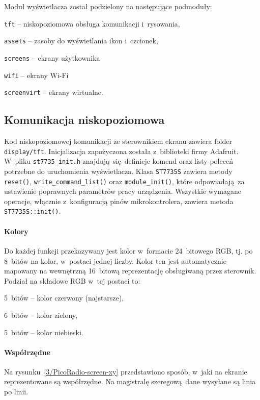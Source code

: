 \documentclass[polish]{aghengthesis}
\let\tempone\itemize
\let\temptwo\enditemize
\renewenvironment{itemize}{\tempone\setlength{\itemsep}{0cm}}{\temptwo}
\begin{document}
		\noindent
		Moduł wyświetlacza został podzielony na następujące podmoduły:
		\begin{itemize}
			\item \lstinline|tft| -- niskopoziomowa obsługa komunikacji i~rysowania,
			\item \lstinline|assets| -- zasoby do wyświetlania ikon i~czcionek,
			\item \lstinline|screens| -- ekrany użytkownika
			\begin{itemize}
				\item \lstinline|wifi| -- ekrany Wi-Fi
			\end{itemize}
			\item \lstinline|screenvirt| -- ekrany wirtualne.
		\end{itemize}
		
		\subsection{Komunikacja niskopoziomowa}
			Kod niskopoziomowej komunikacji ze sterownikiem ekranu zawiera folder \lstinline|display/tft|. Inicjalizacja zapożyczona została z~biblioteki firmy Adafruit. W~pliku \lstinline|st7735_init.h| znajdują się definicje komend oraz listy poleceń potrzebne do uruchomienia wyświetlacza. Klasa \lstinline|ST7735S| zawiera metody \lstinline|reset()|, \lstinline|write_command_list()| oraz \lstinline|module_init()|, które odpowiadają za ustawienie poprawnych parametrów pracy urządzenia. Wszystkie wymagane operacje, włącznie z~konfiguracją pinów mikrokontrolera, zawiera metoda \lstinline|ST7735S::init()|.
			
		\paragraph{Kolory}
			Do każdej funkcji przekazywany jest kolor w~formacie 24~bitowego RGB, tj. po 8~bitów na kolor, w~postaci jednej liczby. Kolor ten jest automatycznie mapowany na wewnętrzną 16~bitową reprezentację obsługiwaną przez sterownik. Podział na składowe RGB w~tej postaci to:
			\begin{itemize}
				\item 5~bitów -- kolor czerwony (najstarsze),
				\item 6~bitów -- kolor zielony,
				\item 5~bitów -- kolor niebieski.
			\end{itemize}
		
		\paragraph{Współrzędne}
			Na rysunku~\ref{3/PicoRadio-screen-xy} przedstawiono sposób, w~jaki na ekranie reprezentowane są współrzędne. Na magistralę szeregową dane wysyłane są linia po linii.
			
\end{document}
